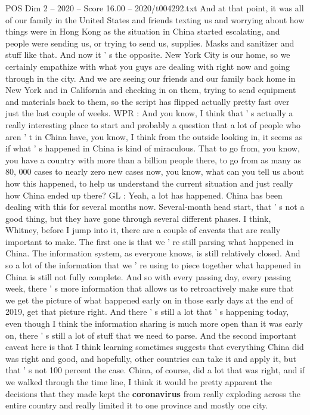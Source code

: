 \begin{textsample}{POS Dim 2 – 2020 – Score 16.00 – 2020/t004292.txt}
And at that point, it was all of our family in the United States and friends texting us and worrying about how things were in Hong Kong as the situation in China started escalating, and people were sending us, or trying to send us, supplies.
Masks and sanitizer and stuff like that.
And now it ' s the opposite.
New York City is our home, so we certainly empathize with what you guys are dealing with right now and going through in the city.
And we are seeing our friends and our family back home in New York and in California and checking in on them, trying to send equipment and materials back to them, so the script has flipped actually pretty fast over just the last couple of weeks.
WPR : And you know, I think that ' s actually a really interesting place to start and probably a question that a lot of people who aren ' t in China have, you know, I think from the outside looking in, it seems as if what ' s happened in China is kind of miraculous.
That to go from, you know, you have a country with more than a billion people there, to go from as many as 80, 000 cases to nearly zero new cases now, you know, what can you tell us about how this happened, to help us understand the current situation and just really how China ended up there?
GL : Yeah, a lot has happened.
China has been dealing with this for several months now.
Several-month head start, that ' s not a good thing, but they have gone through several different phases.
I think, Whitney, before I jump into it, there are a couple of caveats that are really important to make.
The first one is that we ' re still parsing what happened in China.
The information system, as everyone knows, is still relatively closed.
And so a lot of the information that we ' re using to piece together what happened in China is still not fully complete.
And so with every passing day, every passing week, there ' s more information that allows us to retroactively make sure that we get the picture of what happened early on in those early days at the end of 2019, get that picture right.
And there ' s still a lot that ' s happening today, even though I think the information sharing is much more open than it was early on, there ' s still a lot of stuff that we need to parse.
And the second important caveat here is that I think learning sometimes suggests that everything China did was right and good, and hopefully, other countries can take it and apply it, but that ' s not 100 percent the case.
China, of course, did a lot that was right, and if we walked through the time line, I think it would be pretty apparent the decisions that they made kept the \textbf{coronavirus} from really exploding across the entire country and really limited it to one province and mostly one city.

\end{textsample}
